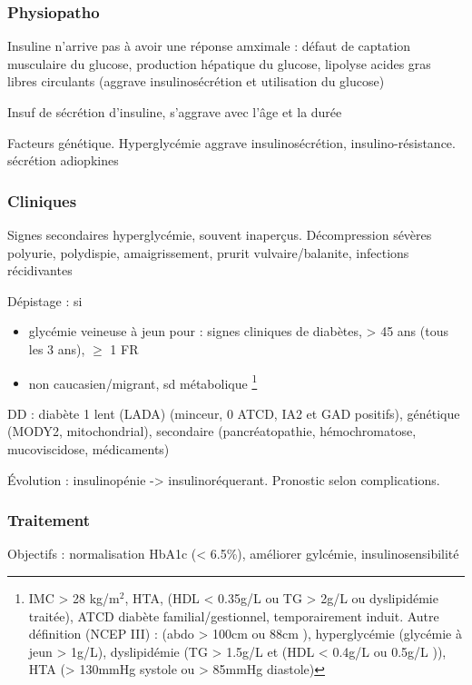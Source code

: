 \documentclass[11pt]{article}
\begin{document}
\subsubsection{Physiopatho}
\label{sec:orgc0d1bf4}
Insuline n'arrive pas à avoir une réponse amximale : défaut de captation
musculaire du glucose, \inc production hépatique du glucose, lipolyse \inc acides gras
libres circulants \thus (aggrave \dec insulinosécrétion et utilisation du glucose)

Insuf de sécrétion d'insuline, s'aggrave avec l'âge et la durée

Facteurs génétique. Hyperglycémie aggrave insulinosécrétion,
insulino-résistance. \dec sécrétion adiopkines

\subsubsection{Cliniques}
\label{sec:org39b5205}
Signes secondaires hyperglycémie, souvent inaperçus. Décompression sévères \thus
polyurie, polydispie, amaigrissement, prurit vulvaire/balanite, infections
récidivantes

Dépistage : si
\begin{itemize}
\item glycémie veineuse à jeun pour : signes cliniques de diabètes, > 45 ans (tous les 3 ans), \(\ge\) 1 FR
\item non caucasien/migrant, sd métabolique \footnote{IMC > 28 kg/m\(^{\text{2}}\), HTA, (HDL < 0.35g/L ou
  TG > 2g/L ou dyslipidémie traitée), ATCD diabète familial/gestionnel,
  temporairement induit.
Autre définition (NCEP III) : (\diameter abdo > 100cm \male ou 88cm \female), hyperglycémie
  (glycémie à jeun > 1g/L), dyslipidémie (TG > 1.5g/L et (HDL < 0.4g/L \male ou
  0.5g/L \female)), HTA (> 130mmHg systole ou > 85mmHg diastole)}
\end{itemize}

DD : diabète 1 lent (LADA) (minceur, 0 ATCD, IA2 et GAD positifs), génétique
(MODY2, mitochondrial), secondaire (pancréatopathie, hémochromatose,
mucoviscidose, médicaments)

Évolution : insulinopénie -> insulinoréquerant. Pronostic selon complications.

\subsubsection{Traitement}
\label{sec:org4ee1468}
Objectifs : normalisation HbA1c (< 6.5\%), améliorer gylcémie, insulinosensibilité
\end{document}
